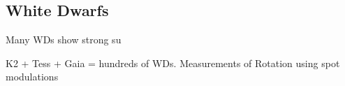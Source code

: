 {\color{red} \subsection{White Dwarfs}}
Many WDs show strong su

K2 + Tess + Gaia = hundreds of WDs. Measurements of Rotation using spot modulations